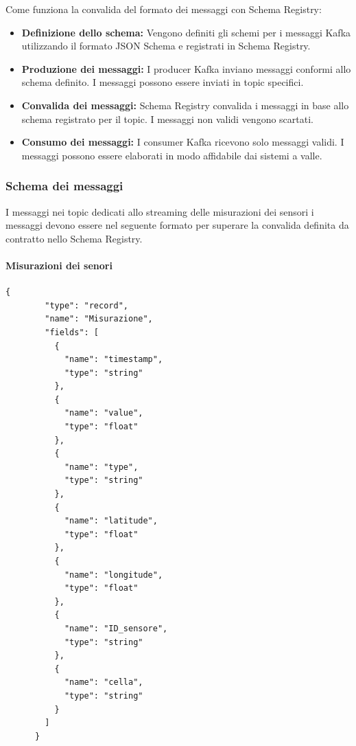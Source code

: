 Come funziona la convalida del formato dei messaggi con Schema Registry:
\begin{itemize}
    \item \textbf{Definizione dello schema:} Vengono definiti gli schemi per i messaggi Kafka utilizzando il formato JSON Schema e registrati in Schema Registry.
    \item \textbf{Produzione dei messaggi:} I producer Kafka inviano messaggi conformi allo schema definito. I messaggi possono essere inviati in topic specifici.
    \item \textbf{Convalida dei messaggi:} Schema Registry convalida i messaggi in base allo schema registrato per il topic. I messaggi non validi vengono scartati.
    \item \textbf{Consumo dei messaggi:} I consumer Kafka ricevono solo messaggi validi. I messaggi possono essere elaborati in modo affidabile dai sistemi a valle.
\end{itemize}

\subsubsection{Schema dei messaggi}\label{sec:schema_registry_sez_schema}
I messaggi nei topic dedicati allo streaming delle misurazioni dei sensori i messaggi devono essere nel seguente formato per superare la convalida definita da contratto nello Schema Registry.
\paragraph{Misurazioni dei senori}
\begin{lstlisting}[style=code]
    {
        "type": "record",
        "name": "Misurazione",
        "fields": [
          {
            "name": "timestamp",
            "type": "string"
          },
          {
            "name": "value",
            "type": "float"
          },
          {
            "name": "type",
            "type": "string"
          },
          {
            "name": "latitude",
            "type": "float"
          },
          {
            "name": "longitude",
            "type": "float"
          },
          {
            "name": "ID_sensore",
            "type": "string"
          },
          {
            "name": "cella",
            "type": "string"
          }
        ]
      }
\end{lstlisting}


